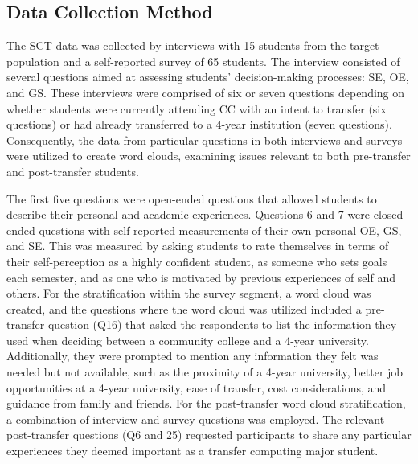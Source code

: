 \documentclass{article}
\begin{document}

\subsection{Data Collection Method}
\small
The SCT data was collected by interviews with 15 students from the target population and a self-reported survey of 65 students. The interview consisted of several questions aimed at assessing students' decision-making processes: SE, OE, and GS.  These interviews were comprised of six or seven questions depending on whether students were currently attending CC with an intent to transfer (six questions) or had already transferred to a 4-year institution (seven questions).
Consequently, the data from particular questions in both interviews and surveys were utilized to create word clouds, examining issues relevant to both pre-transfer and post-transfer students. 

The first five questions were open-ended questions that allowed students to describe their personal and academic experiences. Questions 6 and 7 were closed-ended questions with self-reported measurements of their own personal OE, GS, and SE. This was measured by asking students to rate themselves in terms of their self-perception as a highly confident student, as someone who sets goals each semester, and as one who is motivated by previous experiences of self and others.
For the stratification within the survey segment, a word cloud was created, and the questions where the word cloud was utilized included a pre-transfer question (Q16) that asked the respondents to list the information they used when deciding between a community college and a 4-year university. Additionally, they were prompted to mention any information they felt was needed but not available, such as the proximity of a 4-year university, better job opportunities at a 4-year university, ease of transfer, cost considerations, and guidance from family and friends. For the post-transfer word cloud stratification, a combination of interview and survey questions was employed. The relevant post-transfer questions (Q6 and 25) requested participants to share  any particular experiences they deemed important as a transfer computing major student.
\end{document}
